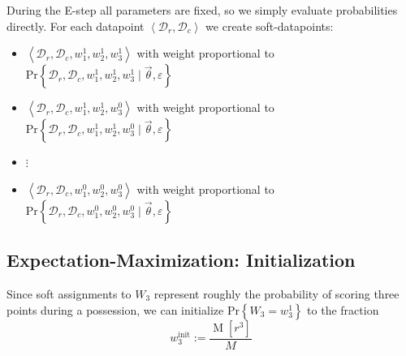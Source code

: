 \documentclass[10pt,twocolumn]{article}
\newcommand{\prb}[1]{\ensuremath{  \mathrm{Pr}\left\{ #1 \right\}  }}
\begin{document}
During the E-step all parameters are fixed, so we simply evaluate probabilities directly.
For each datapoint $\left< \mathcal{D}_r, \mathcal{D}_c \right>$ we create soft-datapoints:
\begin{itemize}
\item $\left< \mathcal{D}_r, \mathcal{D}_c, w_1^1, w_2^1, w_3^1 \right>$  with weight proportional to $\prb{\mathcal{D}_r, \mathcal{D}_c, w_1^1, w_2^1, w_3^1 \mid \vec \theta,\varepsilon}$
\item $\left< \mathcal{D}_r, \mathcal{D}_c, w_1^1, w_2^1, w_3^0 \right>$  with weight proportional to $\prb{\mathcal{D}_r, \mathcal{D}_c, w_1^1, w_2^1, w_3^0\mid \vec \theta,\varepsilon}$
\item $\vdots$
\item $\left< \mathcal{D}_r, \mathcal{D}_c, w_1^0, w_2^0, w_3^0 \right>$  with weight proportional to $\prb{\mathcal{D}_r, \mathcal{D}_c, w_1^0, w_2^0, w_3^0\mid \vec \theta, \varepsilon}$
\end{itemize}

\subsection{Expectation-Maximization: Initialization}


Since soft assignments to $W_3$ represent roughly the probability of scoring three points during a possession,
we can initialize $\prb{W_3 = w_3^1}$ to the fraction
\[
w_3^{\mathrm{init}} := \frac{ \operatorname{M}\left[ r^3 \right] }{ M } 
\]%
\end{document}
